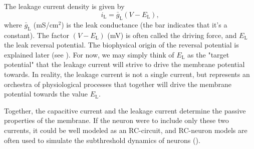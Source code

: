 \subsection{}
\label{sec:Neuron:leak}
The leakage current density is given by
\begin{equation}
i_{\mathrm{L}} = \bar{g}_{\mathrm{L}} (V - E_{\mathrm{L}}),
\label{eq:Neuron:HHleak}
\end{equation}
where $\bar{g}_{\mathrm{L}}$ (mS/cm$^2$) is the leak conductance (the bar indicates that it's a constant). The factor $(V - E_{\mathrm{L}})$ (\si{\milli\volt}) is often called the driving force, and $E_{\mathrm{L}}$ the leak reversal potential. The biophysical origin of the reversal potential is explained later (see ). For now, we may simply think of $E_{\mathrm{L}}$ as the "target potential" that the leakage current will strive to drive the membrane potential towards. In reality, the leakage current is not a single current, but represents an orchestra of physiological processes that together will drive the membrane potential towards the value $E_{\mathrm{L}}$. 

Together, the capacitive current and the leakage current determine the passive properties of the membrane. If the neuron were to include only these two currents, it could be well modeled as an RC-circuit, and RC-neuron models are often used to simulate the subthreshold dynamics of neurons (). 

